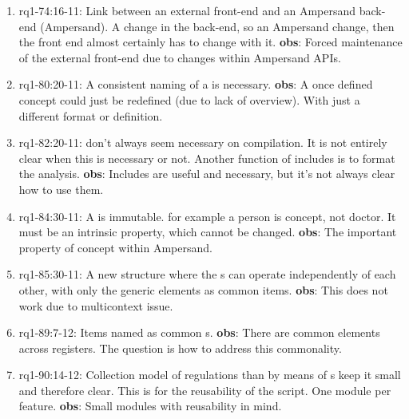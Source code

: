 \begin{enumerate}
    \item rq1-74:16-11: Link between an external front-end and an Ampersand back-end (Ampersand\-).
    A change in the back-end, so an Ampersand change, then the front end almost certainly has to change with it.
    \newline\textbf{obs}: Forced maintenance of the external front-end due to changes within Ampersand APIs.
    
    \item rq1-80:20-11: A consistent naming of a  is necessary.
    \newline\textbf{obs}: A once defined concept could just be redefined (due to lack of overview).
    With just a different format or definition.
    
    \item rq1-82:20-11:  don't always seem necessary on compilation.
    It is not entirely clear when this is necessary or not.
    Another function of includes is to format the analysis.
    \newline\textbf{obs}: Includes are useful and necessary, but it's not always clear how to use them.
    
    \item rq1-84:30-11: A  is immutable.
    for example a person is concept, not doctor.
    It must be an intrinsic property, which cannot be changed.
    \newline\textbf{obs}: The important property of concept within Ampersand.
    
    \item rq1-85:30-11: A new structure where the s can operate independently of each other, with only the generic elements as common items.
    \newline\textbf{obs}: This does not work due to multicontext issue.
    
    \item rq1-89:7-12: Items named as common s.
    \newline\textbf{obs}: There are common elements across registers. The question is how to address this commonality.
    
    \item rq1-90:14-12: Collection model of regulations than by means of s keep it small and therefore clear.
    This is for the reusability of the script.
    One module per feature.
    \newline\textbf{obs}: Small modules with reusability in mind.
    

\end{enumerate}

